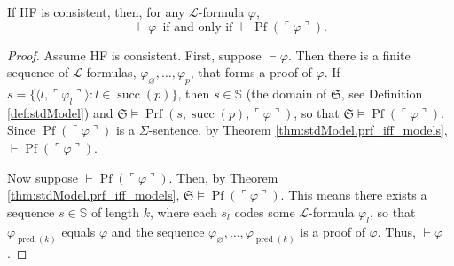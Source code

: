 \begin{theorem}
    \label{thm:prf_iff_prf_Pf_code}
    \leanok
    If HF is consistent, then, for any $\mathcal{L}$-formula $\varphi$,
    $$
    \vdash \varphi \,\text{ if and only if } \vdash \operatorname{Pf}(\ulcorner{\varphi}\urcorner).
    $$
\end{theorem}

\begin{proof}
    Assume HF is consistent. First, suppose $\vdash \varphi$.
    Then there is a finite sequence of $\mathcal{L}$-formulas, $\varphi_{\varnothing}, \ldots, 
    \varphi_p$, that forms a proof of $\varphi$.
    If $s = \{\langle l, \ulcorner{\varphi_l}\urcorner \rangle : l \in \operatorname{succ}(p) \}$,
    then $s \in \mathbb{S}$ (the domain of $\mathfrak{S}$, see Definition \ref{def:stdModel}) and
    $\mathfrak{S} \vDash \operatorname{Prf}(s, \operatorname{succ}(p), 
    \ulcorner{\varphi}\urcorner)$, 
    so that $\mathfrak{S} \vDash \operatorname{Pf}(\ulcorner{\varphi}\urcorner)$.
    Since $\operatorname{Pf}(\ulcorner{\varphi}\urcorner)$ is a $\Sigma$-sentence,
    by Theorem \ref{thm:stdModel.prf_iff_models}, 
    $\vdash \operatorname{Pf}(\ulcorner{\varphi}\urcorner)$.
    
    Now suppose $\vdash \operatorname{Pf}(\ulcorner{\varphi}\urcorner)$.
    Then, by Theorem \ref{thm:stdModel.prf_iff_models}, 
    $\mathfrak{S} \vDash \operatorname{Pf}(\ulcorner{\varphi}\urcorner)$.
    This means there exists a sequence $s \in \mathbb{S}$ of length $k$,
    where each $s_l$ codes some $\mathcal{L}$-formula $\varphi_l$, 
    so that $\varphi_{\operatorname{pred}(k)}$ equals $\varphi$ and the sequence
    $\varphi_{\varnothing}, \ldots, \varphi_{\operatorname{pred}(k)}$ is a proof of $\varphi$.
    Thus, $\vdash \varphi$.
\end{proof}